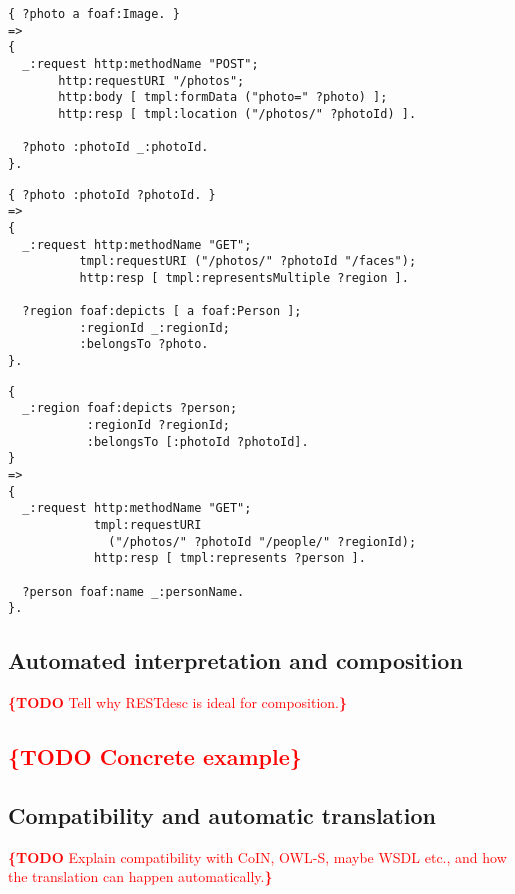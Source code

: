 \documentclass[runningheads,a4paper, twocolumn]{llncs}
\newcommand{\todo}[1]{\noindent\textcolor{red}{{\bf \{TODO} #1{\bf \}}}}
\begin{document}
\begin{lstlisting}[caption=RESTdesc description of photo upload,
                   label=lst:PhotoUpload, float, escapechar=§]
{ ?photo a foaf:Image. }
=>
{
  _:request http:methodName "POST";
       http:requestURI "/photos";
       http:body [ tmpl:formData ("photo=" ?photo) ];
       http:resp [ tmpl:location ("/photos/" ?photoId) ].

  ?photo :photoId _:photoId.
}.
\end{lstlisting}

\begin{lstlisting}[caption=RESTdesc description of face detection,
                   label=lst:FaceDetection, float, escapechar=§]
{ ?photo :photoId ?photoId. }
=>
{
  _:request http:methodName "GET";
          tmpl:requestURI ("/photos/" ?photoId "/faces");
          http:resp [ tmpl:representsMultiple ?region ].
  
  ?region foaf:depicts [ a foaf:Person ];
          :regionId _:regionId;
          :belongsTo ?photo.
}.
\end{lstlisting}

\begin{lstlisting}[caption=RESTdesc description of face recognition,
                   label=lst:FaceRecognition, float, escapechar=§, belowskip=-1em]
{
  _:region foaf:depicts ?person;
           :regionId ?regionId;
           :belongsTo [:photoId ?photoId].
}
=>
{
  _:request http:methodName "GET";
            tmpl:requestURI
              ("/photos/" ?photoId "/people/" ?regionId);
            http:resp [ tmpl:represents ?person ].
  
  ?person foaf:name _:personName.
}.
\end{lstlisting}



\subsection{Automated interpretation and composition}
\todo{Tell why RESTdesc is ideal for composition.}

\subsection{\todo{Concrete example}}
\label{CompositionExample}

\subsection{Compatibility and automatic translation}
\todo{Explain compatibility with CoIN, OWL-S, maybe WSDL etc., and how the translation can happen automatically.}
\end{document}
